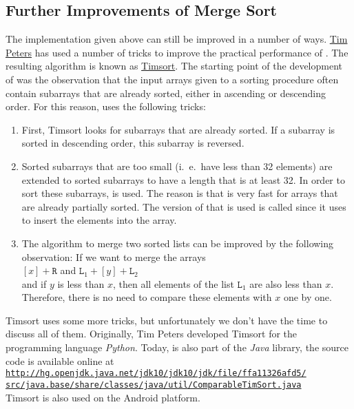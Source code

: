 \subsection{Further Improvements of Merge Sort}
The implementation given above can still be improved in a number of ways.  
\href{http://c2.com/cgi/wiki?TimPeters}{Tim Peters} has used a number of tricks to improve the
practical performance of .  The resulting algorithm is known as
\href{http://en.wikipedia.org/wiki/Timsort}{Timsort}. 
The starting point of the development of  was the observation that the input arrays 
given to a sorting procedure often contain subarrays that are already sorted, either in ascending or
descending order.   For this reason,  uses the following tricks:
\begin{enumerate}
\item First, Timsort looks for subarrays that are already sorted.
      If a subarray is sorted in descending order, this subarray is reversed.
\item Sorted subarrays that are too small (i.~e.~have less than 32 elements) are extended
      to sorted subarrays to have a length that is at least 32.  In order to sort these subarrays,
       is used.  The reason is that  is very fast for
      arrays that are already partially sorted.  The version of  that is used is called
       since it uses 
      \href{http://en.wikipedia.org/wiki/Binary_search}{} to insert the elements
      into the array.
\item The algorithm to merge two sorted lists can be improved by the following observation: If we
      want to merge the arrays
      \\[0.2cm]
      \hspace*{1.3cm}
      $[x] + \mathtt{R}$ \quad and \quad $\mathtt{L}_1 + [y] + \mathtt{L}_2$
      \\[0.2cm]
      and if $y$ is less than $x$, then all elements of the list $\mathtt{L}_1$ are also less than $x$.
      Therefore, there is no need to compare these elements with $x$ one by one.  
\end{enumerate}
Timsort uses some more tricks, but unfortunately we don't have the time to discuss all of them.
Originally, Tim Peters developed Timsort for the programming language \textsl{Python}.  Today,
 is also part of the \textsl{Java} library, the source code is available online at
\\[0.2cm]
\hspace*{0.3cm}
\href{http://hg.openjdk.java.net/jdk10/jdk10/jdk/file/ffa11326afd5/src/java.base/share/classes/java/util/ComparableTimSort.java}{\texttt{http://hg.openjdk.java.net/jdk10/jdk10/jdk/file/ffa11326afd5/\\
\hspace*{1.5cm}
    src/java.base/share/classes/java/util/ComparableTimSort.java}}
\\[0.2cm]
Timsort is also used on the Android platform.

